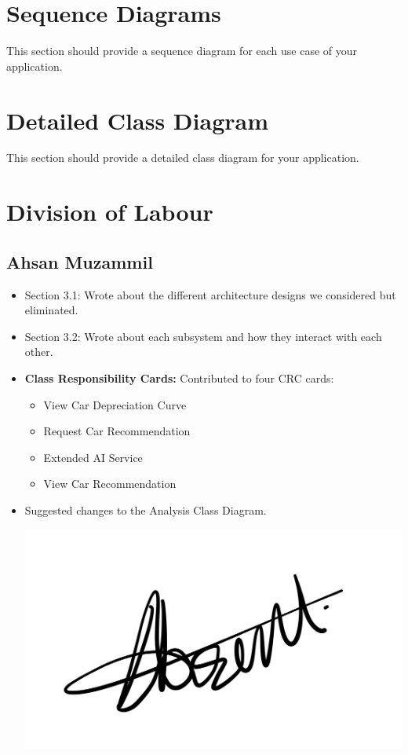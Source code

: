 \documentclass[]{article}
\begin{document}
\section{Sequence Diagrams}
\label{sec:sequence_diagrams}
This section should provide a sequence diagram for each use case of your application.

\section{Detailed Class Diagram}
\label{sec:detailed_class_diagram}
This section should provide a detailed class diagram for your application.

\appendix
\section{Division of Labour}
\label{sec:division_of_labour}
\subsection{Ahsan Muzammil}
\begin{itemize}
  \item Section 3.1: Wrote about the different architecture designs we considered but eliminated.
  \item Section 3.2: Wrote about each subsystem and how they interact with each other.
  \item \textbf{Class Responsibility Cards:} Contributed to four CRC cards:
        \begin{itemize}
          \item View Car Depreciation Curve
          \item Request Car Recommendation
          \item Extended AI Service
          \item View Car Recommendation
        \end{itemize}
  \item Suggested changes to the Analysis Class Diagram.
        \begin{center}
          \includegraphics[scale=0.1]{../Images/ahsan.jpeg}
        \end{center}
\end{itemize}
\end{document}
